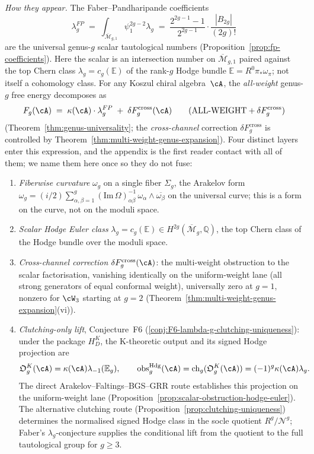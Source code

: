 \emph{How they appear.}
The Faber--Pandharipande coefficients
\[
\lambda_g^{FP}
\;=\;
\int_{\overline{\mathcal{M}}_{g,1}}\psi_1^{2g-2}\lambda_g
\;=\;
\frac{2^{2g-1}-1}{2^{2g-1}} \cdot \frac{|B_{2g}|}{(2g)!}
\]
are the universal genus-$g$ scalar tautological numbers
(Proposition~\ref{prop:fp-coefficients}). Here the scalar is an
intersection number on $\overline{\mathcal{M}}_{g,1}$ paired against
the top Chern class $\lambda_g = c_g(\mathbb{E})$ of the
rank-$g$ Hodge bundle $\mathbb{E} = R^0\pi_*\omega_\pi$; not
itself a cohomology class. For any Koszul chiral algebra~$\cA$,
the \emph{all-weight} genus-$g$ free energy decomposes as
\[
F_g(\cA)
\;=\;
\kappa(\cA)\cdot\lambda_g^{FP}
\;+\;
\delta F_g^{\mathrm{cross}}(\cA)
\qquad\textup{(}\text{ALL-WEIGHT} + \delta F_g^{\mathrm{cross}}\textup{})
\]
(Theorem~\ref{thm:genus-universality}; the
\emph{cross-channel} correction $\delta F_g^{\mathrm{cross}}$ is
controlled by Theorem~\ref{thm:multi-weight-genus-expansion}).
Four distinct layers enter this expression, and the appendix is the
first reader contact with all of them; we name them here once so
they do not fuse:
\begin{enumerate}[label=\textup{(\roman*)}]
\item \emph{Fiberwise curvature} $\omega_g$ on a single fiber
$\Sigma_g$, the Arakelov form
$\omega_g = (i/2)\sum_{\alpha,\beta=1}^g (\mathrm{Im}\,\Omega)^{-1}_{\alpha\beta}
\,\omega_\alpha\wedge\overline{\omega_\beta}$
on the universal curve; this is a form on the curve, not on the
moduli space.
\item \emph{Scalar Hodge Euler class} $\lambda_g = c_g(\mathbb{E}) \in
H^{2g}(\overline{\mathcal{M}}_g,\mathbb{Q})$, the top Chern class of
the Hodge bundle over the moduli space.
\item \emph{Cross-channel correction} $\delta F_g^{\mathrm{cross}}(\cA)$:
the multi-weight obstruction to the scalar factorisation,
vanishing identically on the uniform-weight lane
(all strong generators of equal conformal weight), universally
zero at $g = 1$, nonzero for $\cW_3$ starting at $g = 2$
(Theorem~\ref{thm:multi-weight-genus-expansion}\textup{(vi)}).
\item \emph{Clutching-only lift}, Conjecture~F6
(\ref{conj:F6-lambda-g-clutching-uniqueness}): under the package
$H_D^K$, the K-theoretic output and its signed Hodge projection are
\[
 \mathfrak O_g^K(\cA)=\kappa(\cA)\lambda_{-1}(\mathbb E_g),
 \qquad
 \operatorname{obs}^{\mathrm{Hdg}}_g(\cA)
 =\operatorname{ch}_g(\mathfrak O_g^K(\cA))
 =(-1)^g\kappa(\cA)\lambda_g.
\]
The direct Arakelov--Faltings--BGS--GRR route establishes this
projection on the uniform-weight lane
(Proposition~\ref{prop:scalar-obstruction-hodge-euler}).  The
alternative clutching route
(Proposition~\ref{prop:clutching-uniqueness}) determines the
normalised signed Hodge class in the socle quotient
$R^g/\mathcal{N}^g$; Faber's $\lambda_g$-conjecture supplies the
conditional lift from the quotient to the full tautological group
for $g\geq3$.
\end{enumerate}

